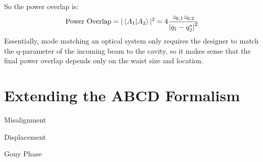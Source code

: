 \begin{appendices}
	So the power overlap is:
	\begin{equation}\label{gauss_power_ovl}
	\text{Power Overlap} = \vert \braket{A_1|A_2} \vert^2 = 4 \frac{ z_{0,1}z_{0,2}}{\abs{q_1 - q_2^*}^2}
	\end{equation}
	Essentially, mode matching an optical system only requires the designer to match the q-parameter of the incoming beam to the cavity, so it makes sense that the final power overlap depends only on the waist size and location.

\chapter{Extending the ABCD Formalism}
Misalignment

Displacement

Gouy Phase

\end{appendices} 
